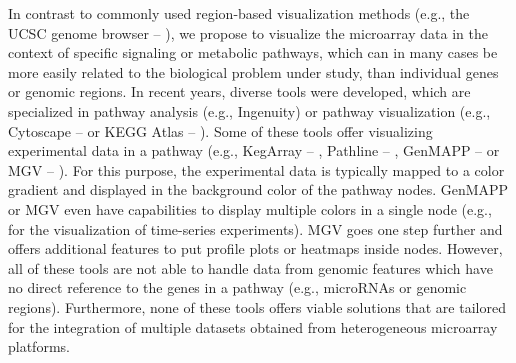 \documentclass{bioinfo}
\begin{document}
In contrast to commonly used region-based visualization methods (e.g., the UCSC genome browser --
\citealp{UCSCBrowser}), we propose to visualize the microarray data in the context of specific
signaling or metabolic pathways, which can in many cases be more easily related to the biological
problem under study, than individual genes or genomic regions.
%
In recent years, diverse tools were developed, which are specialized in pathway analysis (e.g.,
Ingenuity) or pathway visualization (e.g., Cytoscape -- \citealp{Cytoscape} or KEGG Atlas --
\citealp{KEGGAtlas}). Some of these tools offer visualizing experimental data in a pathway (e.g.,
KegArray -- \citealp{KEGG}, Pathline -- \citealp{Pathline}, GenMAPP -- \citealp{GenMAPP} or MGV -- \citealp{Symons2011}). For this
purpose, the experimental data is typically mapped to a color gradient and displayed in the
background color of the pathway nodes. GenMAPP or MGV even have capabilities to display multiple
colors in a single node (e.g., for the visualization of time-series experiments). MGV goes one step
further and offers additional features to put profile plots or heatmaps inside nodes. However, all
of these tools are not able to handle data from genomic features which have no direct reference to
the genes in a pathway (e.g., microRNAs or genomic regions). Furthermore, none of these tools offers
viable solutions that are tailored for the integration of multiple datasets obtained from
heterogeneous microarray platforms.

\end{document}
